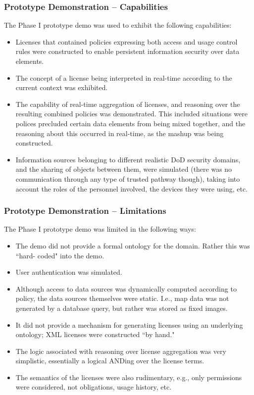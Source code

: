 \documentclass[t,handout, 10pt]{beamer}
\begin{document}
\begin{frame}\frametitle{Prototype Demonstration -- Capabilities}
{\small
The Phase I prototype demo was used to exhibit the following capabilities:
\begin{itemize}
\item Licenses that contained policies expressing both access and usage control rules were constructed to enable persistent information security over data elements.
\pause
\item The concept of a license being interpreted in real-time according to the current
context was exhibited.
\pause
\item The capability of real-time aggregation of licenses, and reasoning over the resulting
combined policies was demonstrated. This included situations were polices precluded certain data elements from being mixed together, and the reasoning about this occurred in real-time, as the mashup was being constructed.
\pause
\item Information sources belonging to different realistic DoD security domains, and the sharing of objects between them, were simulated (there was no communication through any type of trusted pathway though), taking into account the roles of the personnel involved, the devices they were using, etc.
\end{itemize}}
\end{frame}

\begin{frame}\frametitle{Prototype Demonstration -- Limitations}
{\small
The Phase I prototype demo was limited in the following ways:
\begin{itemize}
\item The demo did not provide a formal ontology for the domain. Rather this was ``hard- coded" into the demo.
\pause
\item User authentication was simulated.
\pause
\item Although access to data sources was dynamically computed according to policy, the
data sources themselves were static. I.e., map data was not generated by a database query, but rather was stored as fixed images. 
\pause
\item It did not provide a mechanism for generating licenses using an underlying ontology; XML licenses were constructed ``by hand."
\pause
\item The logic associated with reasoning over license aggregation was very simplistic, essentially a logical ANDing over the license terms.
\pause
\item The semantics of the licenses were also rudimentary, e.g., only permissions were considered, not obligations, usage history, etc.
\end{itemize}}
\end{frame}
\end{document}
